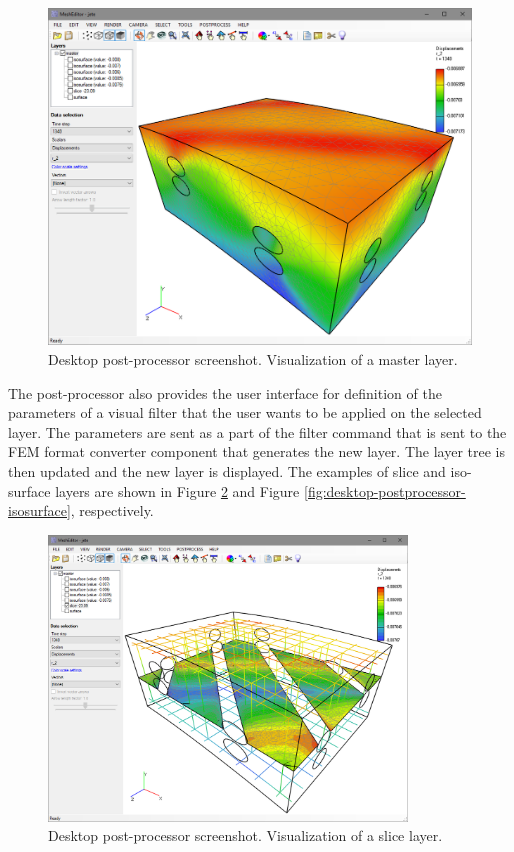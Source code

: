 \begin{figure}[H]
    \centering
    \includegraphics[width=\textwidth]{figures/chapter-data-management/desktop-postprocessor-master}
    \decoRule
    \caption{Desktop post-processor screenshot. Visualization of a master layer.}
    \label{fig:desktop-postprocessor-master}
\end{figure}

The post-processor also provides the user interface for definition of the parameters of a visual filter that the user wants to be applied on the selected layer. The parameters are sent as a part of the filter command that is sent to the FEM format converter component that generates the new layer. The layer tree is then updated and the new layer is displayed. The examples of slice and iso-surface layers are shown in Figure \ref{fig:desktop-postprocessor-slice} and Figure \ref{fig:desktop-postprocessor-isosurface}, respectively.

\begin{figure}[H]
    \centering
    \includegraphics[width=0.85\textwidth]{figures/chapter-data-management/desktop-postprocessor-slice}
    \decoRule
    \caption{Desktop post-processor screenshot. Visualization of a slice layer.}
    \label{fig:desktop-postprocessor-slice}
\end{figure}

